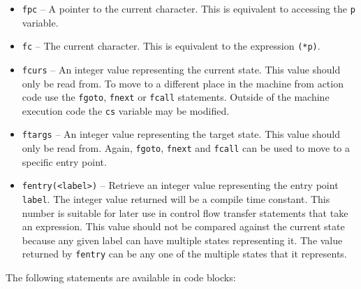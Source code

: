 \documentclass[letterpaper,11pt,oneside]{book}
\begin{document}
\begin{itemize}
\item \verb|fpc| -- A pointer to the current character. This is equivalent to
accessing the \verb|p| variable.

\item \verb|fc| -- The current character. This is equivalent to the expression \verb|(*p)|.

\item \verb|fcurs| -- An integer value representing the current state. This
value should only be read from. To move to a different place in the machine
from action code use the \verb|fgoto|, \verb|fnext| or \verb|fcall| statements.
Outside of the machine execution code the \verb|cs| variable may be modified.

\item \verb|ftargs| -- An integer value representing the target state. This
value should only be read from. Again, \verb|fgoto|, \verb|fnext| and
\verb|fcall| can be used to move to a specific entry point.

\item \verb|fentry(<label>)| -- Retrieve an integer value representing the
entry point \verb|label|. The integer value returned will be a compile time
constant. This number is suitable for later use in control flow transfer
statements that take an expression. This value should not be compared against
the current state because any given label can have multiple states representing
it. The value returned by \verb|fentry| can be any one of the multiple states that
it represents.
\end{itemize}

The following statements are available in code blocks:
\end{document}
